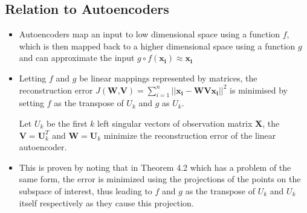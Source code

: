 \documentclass[english]{latex4ei/latex4ei_sheet}
\begin{document}
\begin{sectionbox}
\subsection{Relation to Autoencoders}
\begin{itemize}
    \item Autoencoders map an input to low dimensional space using a function $f$, which is then mapped back to a higher dimensional space using a function $g$ and can approximate the input $g\circ f(\boldsymbol{x_i})\approx\boldsymbol{x_i}$
\item Letting $f$ and $g$ be linear mappings represented by matrices, the reconstruction error $J(\textbf{W,V})=\sum_{i=1}^n||\boldsymbol{x_i-WVx_i}||^2$ is minimised by setting $f$ as the transpose of $U_k$ and $g$ as $U_k$.
\begin{emphbox}
    Let \textbf{$U_k$} be the first $k$ left singular vectors of observation matrix \textbf{X}, the $\textbf{V}=\textbf{U}_k^T$ and $\textbf{W}=\textbf{U}_k$ minimize the reconstruction error of the linear autoencoder.
\end{emphbox}
\item This is proven by noting that in Theorem 4.2 which has a problem of the same form, the error is minimized using the projections of the points on the subspace of interest, thus leading to $f$ and $g$ as the transpose of $U_k$ and $U_k$ itself respectively as they cause this projection.

\end{itemize}
\end{sectionbox}
\end{document}
